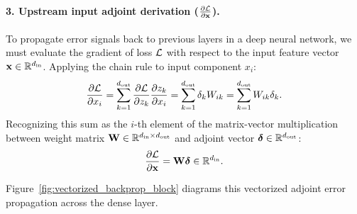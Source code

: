 \documentclass[../../main.tex]{subfiles}
\begin{document}
\paragraph{3. Upstream input adjoint derivation ($\frac{\partial \mathcal{L}}{\partial \mathbf{x}}$).}
To propagate error signals back to previous layers in a deep neural network, we must evaluate the gradient of loss $\mathcal{L}$ with respect to the input feature vector $\mathbf{x} \in \mathbb{R}^{d_{\text{in}}}$. Applying the chain rule to input component $x_i$:
\begin{equation}
\frac{\partial \mathcal{L}}{\partial x_i} = \sum_{k=1}^{d_{\text{out}}} \frac{\partial \mathcal{L}}{\partial z_k} \frac{\partial z_k}{\partial x_i} = \sum_{k=1}^{d_{\text{out}}} \delta_k W_{ik} = \sum_{k=1}^{d_{\text{out}}} W_{ik} \delta_k.
\end{equation}
Recognizing this sum as the $i$-th element of the matrix-vector multiplication between weight matrix $\mathbf{W} \in \mathbb{R}^{d_{\text{in}} \times d_{\text{out}}}$ and adjoint vector $\bm{\delta} \in \mathbb{R}^{d_{\text{out}}}$:
\begin{equation}
\label{eq:input_vector_gradient}
\frac{\partial \mathcal{L}}{\partial \mathbf{x}} = \mathbf{W} \bm{\delta} \in \mathbb{R}^{d_{\text{in}}}.
\end{equation}

Figure~\ref{fig:vectorized_backprop_block} diagrams this vectorized adjoint error propagation across the dense layer.
\end{document}
